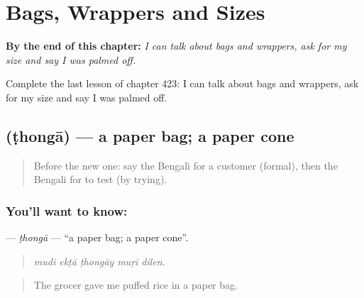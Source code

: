 
\chapter{Bags, Wrappers and Sizes}
\label{ch:bn-bags-wrappers-and-sizes}

\begin{chapteropening}
\textbf{By the end of this chapter:} \emph{I can talk about bags and wrappers, ask for my size and say I was palmed off.}

Complete the last lesson of chapter 423: I can talk about bags and wrappers, ask for my size and say I was palmed off.
\end{chapteropening}

\section[\texorpdfstring{\bn{ঠোঙা} (ṭhongā)}{ঠোঙা (ṭhongā)}]{ (ṭhongā) — a paper bag; a paper cone}

\label{lesson:BN-C423-thonga}



\begin{quote}
Before the new one: say the Bengali for a customer (formal), then the Bengali for to test (by trying).
\end{quote}

\subsection*{You'll want to know: }
\textbf{} — \emph{ṭhongā} — \textquotedblleft{}a paper bag; a paper cone\textquotedblright{}.

\begin{quote}
    
\end{quote}

\begin{quote}
\emph{mudi ekṭā ṭhongāy muṛi dilen.}
\end{quote}

\begin{quote}
The grocer gave me puffed rice in a paper bag.
\end{quote}


